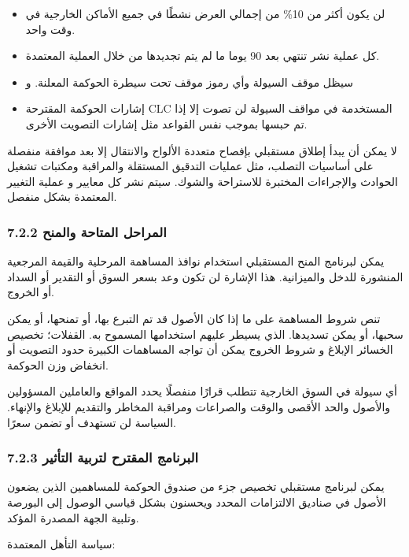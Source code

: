 \documentclass[11pt]{article}
\begin{document}
\begin{itemize}[leftmargin=*]
\item لن يكون أكثر من 10\% من إجمالي العرض نشطًا في جميع الأماكن الخارجية في وقت واحد.
\item كل عملية نشر تنتهي بعد 90 يوما ما لم يتم تجديدها من خلال العملية المعتمدة.
\item سيظل موقف السيولة وأي رموز موقف تحت سيطرة الحوكمة المعلنة. و
\item إشارات الحوكمة المقترحة CLC المستخدمة في مواقف السيولة لن تصوت إلا إذا تم حبسها بموجب نفس القواعد مثل إشارات التصويت الأخرى.
\end{itemize}
لا يمكن أن يبدأ إطلاق مستقبلي بإفصاح متعددة الألواح والانتقال إلا بعد موافقة منفصلة على أساسيات التصلب، مثل عمليات التدقيق المستقلة والمراقبة ومكتبات تشغيل الحوادث والإجراءات المختبرة للاستراحة والشوك. سيتم نشر كل معايير و عملية التغيير المعتمدة بشكل منفصل.

\subsubsection*{7.2.2 المراحل المتاحة والمنح}

يمكن لبرنامج المنح المستقبلي استخدام نوافذ المساهمة المرحلية والقيمة المرجعية المنشورة للدخل والميزانية. هذا الإشارة لن تكون وعد بسعر السوق أو التقدير أو السداد أو الخروج.

تنص شروط المساهمة على ما إذا كان الأصول قد تم التبرع بها، أو تمنحها، أو يمكن سحبها، أو يمكن تسديدها. الذي يسيطر عليهم استخدامها المسموح به. القفلات؛ تخصيص الخسائر الإبلاغ و شروط الخروج يمكن أن تواجه المساهمات الكبيرة حدود التصويت أو انخفاض وزن الحوكمة.

أي سيولة في السوق الخارجية تتطلب قرارًا منفصلًا يحدد المواقع والعاملين المسؤولين والأصول والحد الأقصى والوقت والصراعات ومراقبة المخاطر والتقديم للإبلاغ والإنهاء. السياسة لن تستهدف أو تضمن سعرًا.

\subsubsection*{7.2.3 البرنامج المقترح لتربية التأثير}

يمكن لبرنامج مستقبلي تخصيص جزء من صندوق الحوكمة للمساهمين الذين يضعون الأصول في صناديق الالتزامات المحدد ويحسنون بشكل قياسي الوصول إلى البورصة وتلبية الجهة المصدرة المؤكد.

سياسة التأهل المعتمدة:
\end{document}
